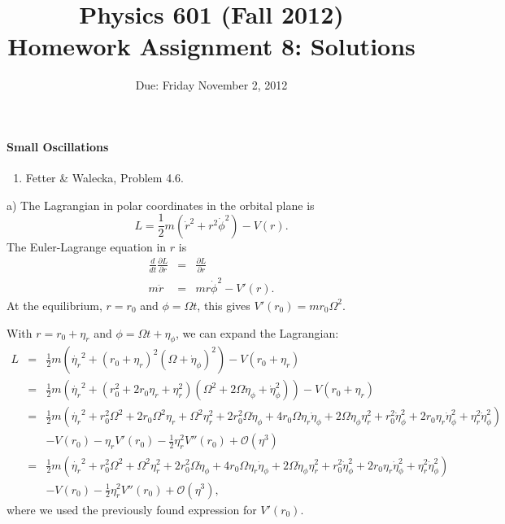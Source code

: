 \documentclass[letterpaper,11pt]{article}
\title{Physics 601 (Fall 2012) \\ Homework Assignment 8: Solutions}
\date{Due: Friday November 2, 2012}
\begin{document}
\maketitle

\paragraph*{Small Oscillations}
\begin{enumerate}
 \item Fetter \& Walecka, Problem 4.6.
\end{enumerate}
a) The Lagrangian in polar coordinates in the orbital plane is
\begin{equation*}
 L = \frac{1}{2} m \left(\dot{r}^2 + r^2\dot{\phi}^2\right) - V(r).
\end{equation*}
The Euler-Lagrange equation in $r$ is
\begin{eqnarray*}
 \frac{d}{dt}\frac{\partial L}{\partial \dot{r}} & = & \frac{\partial L}{\partial r} \\
 m \ddot{r} & = & m r \dot\phi^2 - V'(r).
\end{eqnarray*}
At the equilibrium, $r = r_0$ and $\phi = \Omega t$, this gives $V'(r_0) = m r_0 \Omega^2$.

With $r = r_0 + \eta_r$ and $\phi = \Omega t + \eta_\phi$, we can expand the Lagrangian:
\begin{eqnarray*}
 L & = & \frac{1}{2} m \left(\dot{\eta_r}^2 + (r_0 + \eta_r)^2 (\Omega + \dot\eta_\phi)^2\right) - V(r_0 + \eta_r) \\
   & = & \frac{1}{2} m \left(\dot{\eta_r}^2 + (r_0^2 + 2 r_0 \eta_r + \eta_r^2) (\Omega^2 + 2 \Omega \dot\eta_\phi + \dot\eta_\phi^2)\right) - V(r_0 + \eta_r) \\
   & = & \frac{1}{2} m \left(\dot{\eta_r}^2 + r_0^2 \Omega^2 + 2 r_0 \Omega^2 \eta_r + \Omega^2 \eta_r^2 + 2 r_0^2 \Omega \dot\eta_\phi + 4 r_0 \Omega \eta_r \dot\eta_\phi + 2 \Omega \dot\eta_\phi \eta_r^2 + r_0^2 \dot\eta_\phi^2  + 2 r_0 \eta_r \dot\eta_\phi^2 + \eta_r^2 \dot\eta_\phi^2 \right) \\
   & &  - V(r_0) - \eta_r V'(r_0) - \frac{1}{2} \eta_r^2 V''(r_0) + \mathcal{O}(\eta^3) \\
   & = & \frac{1}{2} m \left(\dot{\eta_r}^2 + r_0^2 \Omega^2 + \Omega^2 \eta_r^2 + 2 r_0^2 \Omega \dot\eta_\phi + 4 r_0 \Omega \eta_r \dot\eta_\phi + 2 \Omega \dot\eta_\phi \eta_r^2 + r_0^2 \dot\eta_\phi^2  + 2 r_0 \eta_r \dot\eta_\phi^2 + \eta_r^2 \dot\eta_\phi^2 \right) \\
   & & - V(r_0) - \frac{1}{2} \eta_r^2 V''(r_0) + \mathcal{O}(\eta^3),
\end{eqnarray*}
where we used the previously found expression for $V'(r_0)$.
\end{document}
